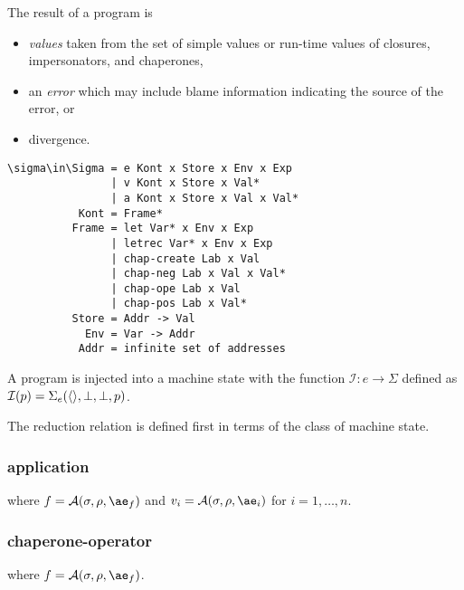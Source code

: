\documentclass{sigplanconf}
\begin{document}
The result of a program is
\begin{itemize}
\item \emph{values} taken from the set of simple values or run-time values of closures, impersonators, and chaperones,
\item an \emph{error} which may include blame information indicating the source of the error, or
\item divergence.
\end{itemize}

\begin{verbatim}
\sigma\in\Sigma = e Kont x Store x Env x Exp
                | v Kont x Store x Val*
                | a Kont x Store x Val x Val*
           Kont = Frame*
          Frame = let Var* x Env x Exp
                | letrec Var* x Env x Exp
                | chap-create Lab x Val
                | chap-neg Lab x Val x Val*
                | chap-ope Lab x Val
                | chap-pos Lab x Val*
          Store = Addr -> Val
            Env = Var -> Addr
           Addr = infinite set of addresses
\end{verbatim}

A program is injected into a machine state with the function $\mathcal{I} : e\rightarrow\Sigma$ defined as $\mathcal{I}(p)=\Sigma_e(\langle\rangle,\perp,\perp,p)$.

The reduction relation is defined first in terms of the class of machine state.

\subsubsection{application}

\noindent
{}

\noindent
where $f=\A{\sigma}{\rho}{\ae_f}$ and $v_i=\A{\sigma}{\rho}{\ae_i}$ for $i=1,\dots,n$.

\subsubsection{chaperone-operator}

\noindent
{}

\noindent
where $f=\A{\sigma}{\rho}{\ae_f}$.

\noindent
{}
\end{document}
